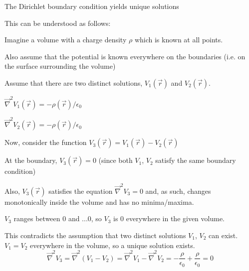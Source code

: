 \begin{frame}{The Dirichlet boundary condition yields unique solutions}

This can be understood as follows:\\
\begin{itemize}
{\small
  \item Imagine a volume with a charge density $\rho$ which is known at all points.
  \item Also assume that the potential is known everywhere on the boundaries (i.e. on the surface surrounding the volume)
  \item Assume that there are two distinct solutions, $V_{1}(\vec{r})$ and $V_{2}(\vec{r})$.
    \begin{itemize}
    {\small
       \item $\vec{\nabla}^{2}V_1(\vec{r}) = -\rho(\vec{r})/\epsilon_0$
       \item $\vec{\nabla}^{2}V_2(\vec{r}) = -\rho(\vec{r})/\epsilon_0$
    }
    \end{itemize}
  \item Now, consider the function $V_{3}(\vec{r}) = V_{1}(\vec{r}) - V_{2}(\vec{r})$
    \begin{itemize}
    {\small
      \item At the boundary, $V_{3}(\vec{r}) = 0$ (since both $V_1$, $V_2$ satisfy the same boundary condition)
      \item Also, $V_{3}(\vec{r})$ satisfies the equation $\vec{\nabla}^{2}V_{3} = 0$ and, as such, changes monotonically inside the volume and has no minima/maxima.
    }
    \end{itemize}
  \item $V_3$ ranges between 0 and ...0, so $V_3$ is 0 everywhere in the given volume.
  \item This contradicts the assumption that two distinct solutions $V_1$, $V_2$ can exist.
        $V_1 = V_2$ everywhere in the volume, so a unique solution exists.
    \begin{equation*}
      \vec{\nabla}^{2}V_{3} = \vec{\nabla}^{2}(V_1-V_2) = \vec{\nabla}^{2}V_1 - \vec{\nabla}^{2}V_2 = - \frac{\rho}{\epsilon_0} + \frac{\rho}{\epsilon_0} = 0
    \end{equation*}
}
\end{itemize}

\end{frame}

%
%
%

